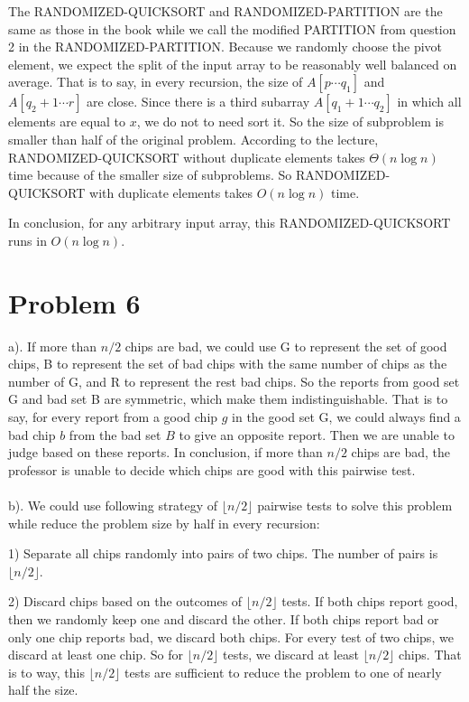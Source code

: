 \documentclass[twoside,11pt]{homework}
\begin{document}
 The RANDOMIZED-QUICKSORT and RANDOMIZED-PARTITION are the same as those in the book while we call the modified PARTITION from question 2 in the RANDOMIZED-PARTITION.
 Because we randomly choose the pivot element, we expect the split of the input array to be reasonably well balanced on average.
 That is to say, in every recursion, the size of $A[p \cdots q_1]$ and $A[q_2+1 \cdots r]$ are close.
 Since there is a third subarray $A[q_1+1 \cdots q_2]$  in which all elements are equal to $x$, we do not to need sort it.
 So the size of subproblem is smaller than half of the original problem. 
 According to the lecture, RANDOMIZED-QUICKSORT without duplicate elements takes $\Theta(n \log n)$ time because of the smaller size of subproblems.
 So RANDOMIZED-QUICKSORT with duplicate elements takes $O(n \log n)$ time.

 In conclusion, for any arbitrary input array, this RANDOMIZED-QUICKSORT runs in $O(n \log n)$.

\section*{Problem 6}
a).
If more than $n/2$ chips are bad, we could use G to represent the set of good chips, B to represent the set of bad chips with the same number of chips as the number of G, and R to represent the rest bad chips.
So the reports from good set G and bad set B are symmetric, which make them indistinguishable.
That is to say, for every report from a good chip $g$ in the good set G, we could always find a bad chip $b$ from the bad set $B$ to give an opposite report.
Then we are unable to judge based on these reports.
In conclusion, if more than $n/2$ chips are bad, the professor is unable to decide which chips are good with this pairwise test.
\\\\
b).
We could use following strategy of $\lfloor n/2 \rfloor$ pairwise tests to solve this problem while reduce the problem size by half in every recursion:

1) Separate all chips randomly into pairs of two chips.
The number of pairs is $\lfloor n/2 \rfloor$.

2) Discard chips based on the outcomes of $\lfloor n/2 \rfloor$ tests.
If both chips report good, then we randomly keep one and discard the other. 
If both chips report bad or only one chip reports bad, we discard both chips.
For every test of two chips, we discard at least one chip.
So for  $\lfloor n/2 \rfloor$ tests, we discard at least  $\lfloor n/2 \rfloor$ chips. 
That is to way, this $\lfloor n/2 \rfloor$ tests are sufficient to reduce the problem to one of nearly half the size.
\end{document}
